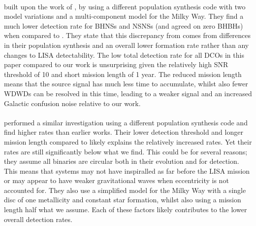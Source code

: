 \paragraph{\citet{Belczynski+2010}} built upon the work of \citet{Nelemans+2001}, by using a different population synthesis code with two model variations and a multi-component model for the Milky Way. They find a much lower detection rate for BHNSs and NSNSs (and agreed on zero BHBHs) when compared to \citet{Nelemans+2001}. They state that this discrepancy from \citet{Nelemans+2001} comes from differences in their population synthesis and an overall lower formation rate rather than any changes to LISA detectability. The low total detection rate for all DCOs in this paper compared to our work is unsurprising given the relatively high SNR threshold of 10 and short mission length of 1 year. The reduced mission length means that the source signal has much less time to accumulate, whilst also fewer WDWDs can be resolved in this time, leading to a weaker signal and an increased Galactic confusion noise relative to our work.

\paragraph{\citet{Liu+2014}} performed a similar investigation using a different population synthesis code and find higher rates than earlier works. Their lower detection threshold and longer mission length compared to \citet{Belczynski+2010} likely explains the relatively increased rates. Yet their rates are still significantly below what we find. This could be for several reasons; they assume all binaries are circular both in their evolution and for detection. This means that systems may not have inspiralled as far before the LISA mission or may appear to have weaker gravitational waves when eccentricity is not accounted for. They also use a simplified model for the Milky Way with a single disc of one metallicity and constant star formation, whilst also using a mission length half what we assume. Each of these factors likely contributes to the lower overall detection rates.

